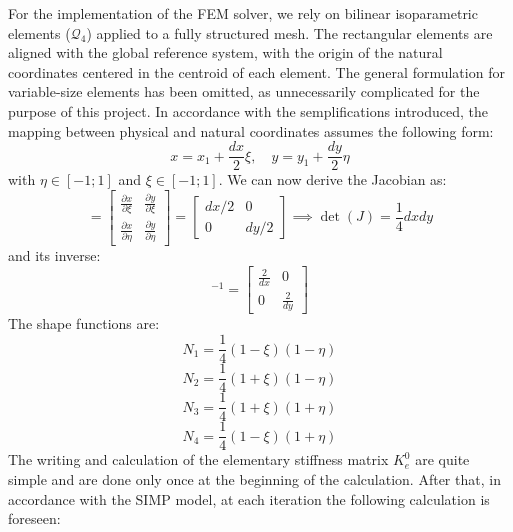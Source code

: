 \documentclass{article}
\begin{document}
\noindent For the implementation of the FEM solver, we rely on bilinear isoparametric elements ($\mathcal{Q}_4$) applied to a fully structured mesh. The rectangular elements are aligned with the global reference system, with the origin of the natural coordinates centered in the centroid of each element. The general formulation for variable-size elements has been omitted, as unnecessarily complicated for the purpose of this project. In accordance with the semplifications introduced, the mapping between physical and natural coordinates assumes the following form:
\begin{equation}
x = x_1 + \frac{dx}{2}\xi, \quad y = y_1 + \frac{dy}{2}\eta
\end{equation}
\noindent with $\eta \in [-1; 1]$ and $\xi \in [-1; 1]$. We can now derive the Jacobian as:
\begin{equation}
[J] = \begin{bmatrix} \frac{\partial x}{\partial \xi} & \frac{\partial y}{\partial \xi} \\ \frac{\partial x}{\partial \eta} & \frac{\partial y}{\partial \eta} \end{bmatrix} = \begin{bmatrix} dx/2 & 0 \\ 0 & dy/2 \end{bmatrix} \implies \det(J) = \frac{1}{4}dxdy
\end{equation}
\noindent and its inverse:
\begin{equation}
[J]^{-1} = \begin{bmatrix} \frac{2}{dx} & 0 \\ 0 & \frac{2}{dy} \end{bmatrix}
\end{equation}
\noindent The shape functions are:
\begin{equation}
N_1 = \frac{1}{4}(1 - \xi)(1 - \eta)
\end{equation}
\begin{equation}
N_2 = \frac{1}{4}(1 + \xi)(1 - \eta)
\end{equation}
\begin{equation}
N_3 = \frac{1}{4}(1 + \xi)(1 + \eta)
\end{equation}
\begin{equation}
N_4 = \frac{1}{4}(1 - \xi)(1 + \eta)
\end{equation}
\noindent The writing and calculation of the elementary stiffness matrix $K_e^0$ are quite simple and are done only once at the beginning of the calculation. After that, in accordance with the SIMP model, at each iteration the following calculation is foreseen:
\end{document}
